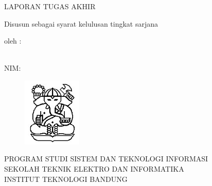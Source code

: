 \clearpage
\pagestyle{empty}

\begin{center}
\smallskip

    \Large \MakeUppercase{\bfseries \thetitle}
    \vfill

    \normalsize \MakeUppercase{Laporan Tugas Akhir}
    \vfill

    \normalsize Disusun sebagai syarat kelulusan tingkat sarjana
    \vfill

    \normalsize oleh :

    \normalsize \theauthor \\
    \normalsize NIM: \nim

    \vfill
    \begin{figure}[h]
        \centering
      	\includegraphics[width=0.25\textwidth]{resources/cover-ganesha.jpg}
    \end{figure}
    \vfill

    \large
    \uppercase{
        Program Studi Sistem dan Teknologi Informasi \\
        Sekolah Teknik Elektro dan Informatika \\
        Institut Teknologi Bandung \\
    }
    \yearsidang{}

\end{center}

\clearpage
